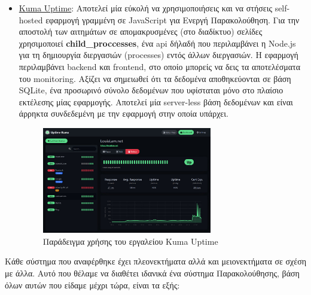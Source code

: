 \begin{itemize}
	\item \href{https://github.com/louislam/uptime-kuma}{Kuma Uptime}: Αποτελεί μία εύκολή να χρησιμοποιήσεις και να στήσεις
	      self-hosted εφαρμογή γραμμένη σε JavaScript για Ενεργή Παρακολούθηση. Για την αποστολή των αιτημάτων σε απομακρυσμένες (στο διαδίκτυο) σελίδες
	      χρησιμοποιεί \textbf{child\_proccesses}, ένα api δήλαδή που περιλαμβάνει η Node.js για τη δημιουργία διεργασιών (processes) εντός άλλων διεργασιών.
	      Η εφαρμογή περιλαμβάνει backend και frontend, στο οποίο μπορείς να δεις τα αποτελέσματα του monitoring. Αξίζει να σημειωθεί
	      ότι τα δεδομένα αποθηκεύονται σε βάση SQLite, ένα προσωρινό σύνολο δεδομένων που υφίσταται μόνο στο πλαίσιο εκτέλεσης μίας εφαρμογής.
	      Αποτελεί μία server-less βάση δεδομένων και είναι άρρηκτα συνδεδεμένη με την εφαρμογή στην οποία υπάρχει.
	      \begin{figure}[!ht]
		      \centering
		      \includegraphics[width=0.7\textwidth]{./images/chapter3/kuma-uptime.jpg}
		      \caption[Παράδειγμα χρήσης του εργαλείου Kuma Uptime]{Παράδειγμα χρήσης του εργαλείου Kuma Uptime}
		      \label{fig:kuma_uptime}
	      \end{figure}
\end{itemize}

Κάθε σύστημα που αναφέρθηκε έχει πλεονεκτήματα αλλά και μειονεκτήματα σε σχέση με άλλα.
Αυτό που θέλαμε να διαθέτει ιδανικά ένα σύστημα Παρακολούθησης, βάση όλων αυτών που είδαμε μέχρι τώρα,
είναι τα εξής:

